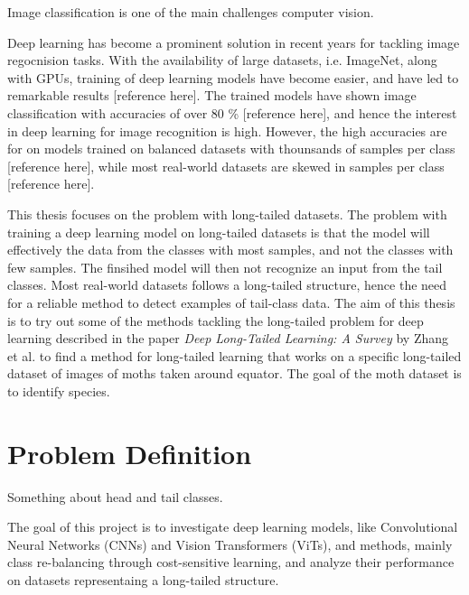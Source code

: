 

\label{sec:introduction}
Image classification is one of the main challenges computer vision.

Deep learning has become a prominent solution in recent years for tackling image regocnision tasks. With the availability of large datasets, i.e. ImageNet, along with GPUs, training of deep learning models have become easier, and have led to remarkable results [reference here]. The trained models have shown image classification with accuracies of over 80 \% [reference here], and hence the interest in deep learning for image recognition is high. However, the high accuracies are for on models trained on balanced datasets with thounsands of samples per class [reference here], while most real-world datasets are skewed in samples per class [reference here].  


This thesis focuses on the problem with long-tailed datasets. The problem with training a deep learning model on long-tailed datasets is that the model will effectively the data from the classes with most samples, and not the classes with few samples. The finsihed model will then not recognize an input from the tail classes. Most real-world datasets follows a long-tailed structure, hence the need for a reliable method to detect examples of tail-class data. The aim of this thesis is to try out some of the methods tackling the long-tailed problem for deep learning described in the paper \textit{Deep Long-Tailed Learning: A Survey} by Zhang et al.\cite{zhang2023deep} to find a method for long-tailed learning that works on a specific long-tailed dataset of images of moths taken around equator. The goal of the moth dataset is to identify species.

\section{Problem Definition}
Something about head and tail classes.


The goal of this project is to investigate deep learning models, like Convolutional Neural Networks (CNNs) and Vision Transformers (ViTs), and methods, mainly class re-balancing through cost-sensitive learning, and analyze their performance on datasets representaing a long-tailed structure.  

